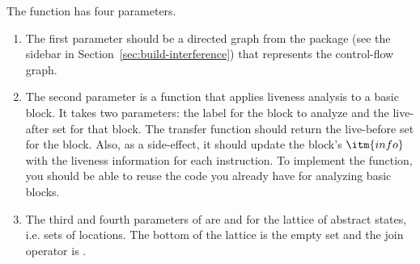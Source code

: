 \documentclass[11pt]{book}
\newcommand{\ocaml}[1]{{\color{blue}{#1}}}
\begin{document}
The  function has four parameters.
\begin{enumerate}
\item The first parameter  should be a directed graph from the
   package (see the sidebar in
  Section~\ref{sec:build-interference}) that represents the
  control-flow graph. \ocaml{Remember that it is necessary to
    transpose the CFG for a backward dataflow problem. The functor
  provides separate entry points for forward and backward analyses.}
\item The second parameter  is a function that applies
  liveness analysis to a basic block. It takes two parameters: the
  label for the block to analyze and the live-after set for that
  block.  The transfer function should return the live-before set for
  the block.  Also, as a side-effect, it should update the block's
  $\itm{info}$ with the liveness information for each instruction. To
  implement the  function, you should be able to reuse
  the code you already have for analyzing basic blocks. \ocaml{Depending on
    how you wrote that code, you may need to refactor it slightly.}
\item The third and fourth parameters of  are
   and  for the lattice of abstract states,
  i.e.  sets of locations. The bottom of the lattice is the empty set
   and the join operator is . \ocaml{These
    parameters are provided once-and-for-all when the functor is
    instanstantiated.}
\end{enumerate}
\end{document}
